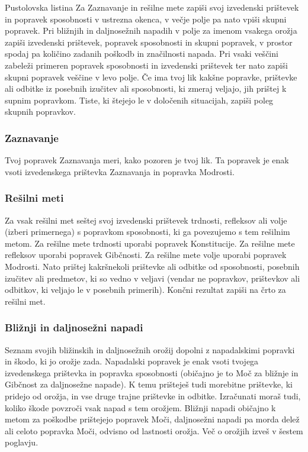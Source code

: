 \begin{rpg-titlebox}{Pustolovska listina}
    Za Zaznavanje in rešilne mete zapiši svoj izvedenski prištevek in popravek sposobnosti v ustrezna okenca, v večje polje pa nato vpiši skupni popravek. Pri bližnjih in daljnosežnih napadih v polje za imenom vsakega orožja zapiši izvedenski prištevek, popravek sposobnosti in skupni popravek, v prostor spodaj pa količino zadanih poškodb in značilnosti napada. Pri vsaki veščini zabeleži primeren popravek sposobnosti in izvedenski prištevek ter nato zapiši skupni popravek veščine v levo polje. Če ima tvoj lik kakšne popravke, prištevke ali odbitke iz posebnih izučitev ali sposobnosti, ki zmeraj veljajo, jih prištej k supnim popravkom. Tiste, ki štejejo le v določenih situacijah, zapiši poleg skupnih popravkov.
\end{rpg-titlebox}

\subsubsection{Zaznavanje}
Tvoj popravek Zaznavanja meri, kako pozoren je tvoj lik. Ta popravek je enak vsoti izvedenskega prištevka Zaznavanja in popravka Modrosti.

\subsubsection{Rešilni meti}
Za vsak rešilni met seštej svoj izvedenski prištevek trdnosti, refleksov ali volje (izberi primernega) s popravkom sposobnosti, ki ga povezujemo s tem rešilnim metom. Za rešilne mete trdnosti uporabi popravek Konstitucije. Za rešilne mete refleksov uporabi popravek Gibčnosti. Za rešilne mete volje uporabi popravek Modrosti. Nato prištej kakršnekoli prištevke ali odbitke od sposobnosti, posebnih izučitev ali predmetov, ki so vedno v veljavi (vendar ne popravkov, prištevkov ali odbitkov, ki veljajo le v posebnih primerih). Končni rezultat zapiši na črto za rešilni met.

\subsubsection{Bližnji in daljnosežni napadi}
Seznam svojih bližinskih in daljnosežnih orožij dopolni z napadalskimi popravki in škodo, ki jo orožje zada. Napadalski popravek je enak vsoti tvojega izvedenskega prištevka in popravka sposobnosti (običajno je to Moč za bližnje in Gibčnost za daljnosežne napade). K temu prišteješ tudi morebitne prištevke, ki pridejo od orožja, in vse druge trajne prištevke in odbitke. Izračunati moraš tudi, koliko škode povzroči vsak napad s tem orožjem. Bližnji napadi običajno k metom za poškodbe prištejejo popravek Moči, daljnosežni napadi pa morda delež ali celoto popravka Moči, odvisno od lastnosti orožja. Več o orožjih izveš v šestem poglavju.

